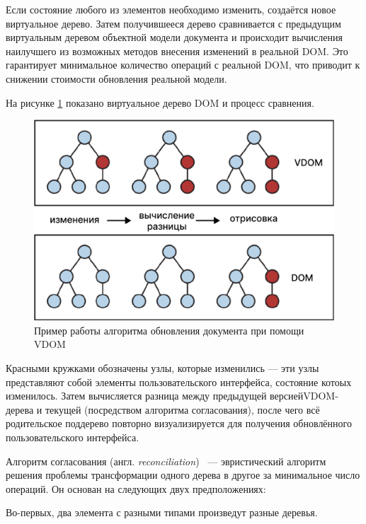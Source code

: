 Если состояние любого из элементов необходимо изменить, создаётся новое виртуальное дерево.
Затем получившееся дерево сравнивается с предыдущим виртуальным деревом объектной модели документа и происходит вычисления наилучшего из возможных методов внесения изменений в реальной DOM.
Это гарантирует минимальное количество операций с реальной DOM, что приводит к снижении стоимости обновления реальной модели.

На рисунке \ref{fig:vdom-example} показано виртуальное дерево DOM и процесс сравнения.

\begin{figure}[h]
	\centering
	\captionsetup{justification=centering}
	\includegraphics[width=130mm]{img/vdom-example.png}
	\caption{Пример работы алгоритма обновления документа при помощи VDOM}
	\label{fig:vdom-example}
\end{figure}

Красными кружками обозначены узлы, которые изменились --- эти узлы представляют собой элементы пользовательского интерфейса, состояние котоых изменилось.
Затем вычисляется разница между предыдущей версией\break VDOM-дерева и текущей (посредством алгоритма согласования), после чего всё родительское поддерево повторно визуализируется для получения обновлённого пользовательского интерфейса.


Алгоритм согласования (англ. \textit{reconciliation})~\cite{reconciliation} --- эвристический алгоритм решения проблемы трансформации одного дерева в другое за минимальное число операций.
Он основан на следующих двух предположениях:

Во-первых, два элемента с разными типами произведут разные деревья.

